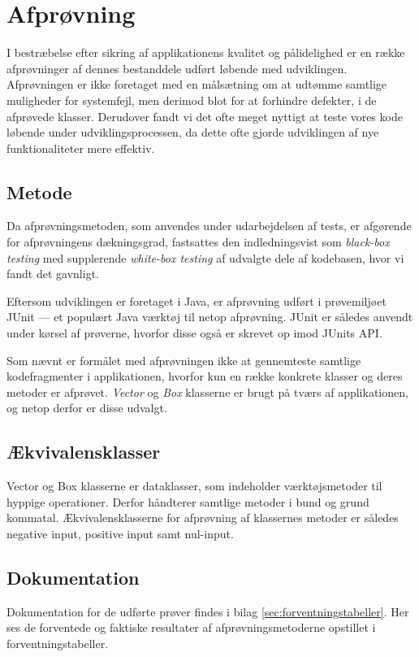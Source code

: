 \section{Afprøvning}
\label{sec:afproevning}
I bestræbelse efter sikring af applikationens kvalitet og pålidelighed er en række afprøvninger af dennes bestanddele udført løbende med udviklingen. Afprøvningen er ikke foretaget med en målsætning om at udtømme samtlige muligheder for systemfejl, men derimod blot for at forhindre defekter, i de afprøvede klasser. Derudover fandt vi det ofte meget nyttigt at teste vores kode løbende under udviklingsprocessen, da dette ofte gjorde udviklingen af nye funktionaliteter mere effektiv.

\subsection{Metode}
\label{subsec:metode}
Da afprøvningsmetoden, som anvendes under udarbejdelsen af tests, er afgørende for afprøvningens dækningsgrad, fastsattes den indledningsvist som \emph{black-box testing} med supplerende \emph{white-box testing} af udvalgte dele af kodebasen, hvor vi fandt det gavnligt.

Eftersom udviklingen er foretaget i Java, er afprøvning udført i prøvemiljøet JUnit --- et populært Java værktøj til netop afprøvning. JUnit er således anvendt under kørsel af prøverne, hvorfor disse også er skrevet op imod JUnits API.

Som nævnt er formålet med afprøvningen ikke at gennemteste samtlige kodefragmenter i applikationen, hvorfor kun en række konkrete klasser og deres metoder er afprøvet. \emph{Vector} og \emph{Box} klasserne er brugt på tværs af applikationen, og netop derfor er disse udvalgt.

\subsection{Ækvivalensklasser}
\label{subsec:aekvivalensklasser}
Vector og Box klasserne er dataklasser, som indeholder værktøjsmetoder til hyppige operationer. Derfor håndterer samtlige metoder i bund og grund kommatal. Ækvivalensklasserne for afprøvning af klassernes metoder er således negative input, positive input samt nul-input.

\subsection{Dokumentation}
\label{subsec:dokumentation}
Dokumentation for de udførte prøver findes i bilag \ref{sec:forventningstabeller}. Her ses de forventede og faktiske resultater af afprøvningsmetoderne opstillet i forventningstabeller.